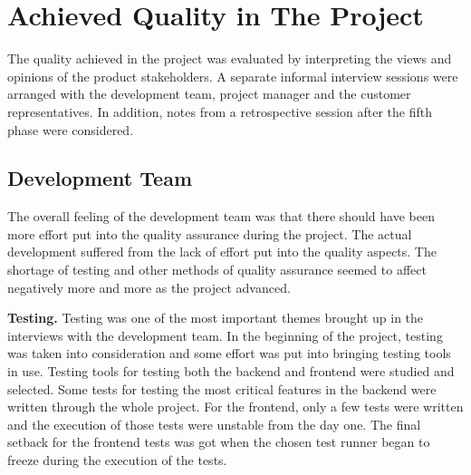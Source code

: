 



 


 \section{Achieved Quality in The Project}

 The quality achieved in the project was evaluated by interpreting the views and opinions of the product stakeholders. A separate informal interview sessions were arranged with the development team, project manager and the customer representatives. In addition, notes from a retrospective session after the fifth phase were considered.

\subsection{Development Team}

The overall feeling of the development team was that there should have been more effort put into the quality assurance during the project. The actual development suffered from the lack of effort put into the quality aspects. The shortage of testing and other methods of quality assurance seemed to affect negatively more and more as the project advanced. 

\textbf{Testing.} Testing was one of the most important themes brought up in the interviews with the development team. In the beginning of the project, testing was taken into consideration and some effort was put into bringing testing tools in use. Testing tools for testing both the backend and frontend were studied and selected. Some tests for testing the most critical features in the backend were written through the whole project. For the frontend, only a few tests were written and the execution of those tests were unstable from the day one. The final setback for the frontend tests was got when the chosen test runner began to freeze during the execution of the tests.


